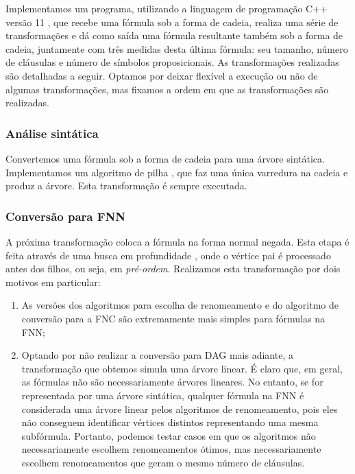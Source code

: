 Implementamos um programa, utilizando a linguagem de programação C++ versão 11 \cite{cpp11}, que recebe uma fórmula sob a forma de cadeia, realiza uma série de transformações e dá como saída uma fórmula resultante também sob a forma de cadeia, juntamente com três medidas desta última fórmula: seu tamanho, número de cláusulas e número de símbolos proposicionais. As transformações realizadas são detalhadas a seguir. Optamos por deixar flexível a execução ou não de algumas transformações, mas fixamos a ordem em que as transformações são realizadas.

\subsubsection{Análise sintática}

\indent

Convertemos uma fórmula sob a forma de cadeia para uma árvore sintática. Implementamos um algoritmo de pilha \cite{sipser2012introduction,CLRS09}, que faz uma única varredura na cadeia e produz a árvore. Esta transformação é sempre executada.

\subsubsection{Conversão para FNN}

\indent

A próxima transformação coloca a fórmula na forma normal negada. Esta etapa é feita através de uma busca em profundidade \cite{CLRS09}, onde o vértice pai é processado antes dos filhos, ou seja, em \emph{pré-ordem}. Realizamos esta transformação por dois motivos em particular:
\begin{enumerate}
	\item As versões dos algoritmos para escolha de renomeamento e do algoritmo de conversão para a FNC são extremamente mais simples para fórmulas na FNN;
	\item Optando por não realizar a conversão para DAG mais adiante, a transformação que obtemos simula uma árvore linear. É claro que, em geral, as fórmulas não são necessariamente árvores lineares. No entanto, se for representada por uma árvore sintática, qualquer fórmula na FNN é considerada uma árvore linear pelos algoritmos de renomeamento, pois eles não conseguem identificar vértices distintos representando uma mesma subfórmula. Portanto, podemos testar casos em que os algoritmos não necessariamente escolhem renomeamentos ótimos, mas necessariamente escolhem renomeamentos que geram o mesmo número de cláusulas.
\end{enumerate}

